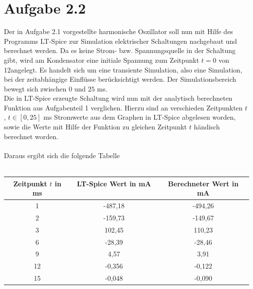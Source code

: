 \section{Aufgabe 2.2}\label{sec:ag2.2}
Der in Aufgabe 2.1 vorgestellte harmonische Oszillator soll nun mit Hilfe des Programms \glqq LT-Spice\grqq{} zur Simulation elektrischer Schaltungen nachgebaut und berechnet werden. Da es keine Strom- bzw. Spannungsquelle in der Schaltung gibt, wird am Kondensator eine initiale Spannung zum Zeitpunkt $t = 0$ von 12\volt angelegt. Es handelt sich um eine transiente Simulation, also eine Simulation, bei der zeitabhängige Einflüsse berücksichtigt werden. Der Simulationsbereich bewegt sich zwischen $0$ und $25$ \si{\milli\second}. \\
Die in LT-Spice erzeugte Schaltung wird nun mit der analytisch berechneten Funktion aus Aufgabenteil 1 verglichen. Hierzu sind an verschieden Zeitpunkten $t$ , $t \in [0,25]$ \si{\milli\second} Stromwerte aus dem Graphen in LT-Spice abgelesen worden, sowie die Werte mit Hilfe der Funktion zu gleichen Zeitpunkt $t$ händisch berechnet worden.\\ \\
Daraus ergibt sich die folgende Tabelle\\ \\
\begin{table}[h]
	\centering
	\begin{tabular}[h]{c|c|c}
		Zeitpunkt $t$ in \si{\milli\second} & LT-Spice Wert in \si{\milli\ampere} \ & Berechneter Wert in \si{\milli\ampere} \\
		\hline
		1 & -487,18 & -494,26 \\
		2 & -159,73 & -149,67\\
		3 & 102,45 & 110,23\\
		6 & -28,39 & -28,46\\
		9 & 4,57 & 3,91\\
		12 & -0,356 & -0,122\\
		15 & -0,048 & -0,090\\
	\end{tabular}
\end{table}\\
\\

